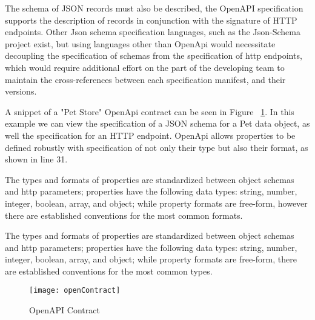 The schema of JSON records must also be described,
the OpenAPI specification supports the description of records
in conjunction with the signature of HTTP endpoints.
Other Json schema specification languages, such as the Json-Schema project
exist, but using languages other than OpenApi would necessitate decoupling the specification of schemas from the specification
of http endpoints, which would require additional effort on the part of the developing team to maintain the cross-references
between each specification manifest, and their versions.

A snippet of a "Pet Store" OpenApi contract can be seen in Figure ~\ref{fig:open_contract}.
In this example we can view the specification of a JSON schema for a Pet data object,
as well the specification for an HTTP endpoint.
OpenApi allows properties to be defined robustly with specification of not only their type but also their format, as shown in line 31.

The types and formats of properties are standardized between object schemas and http parameters;
properties have the following data types: string, number, integer, boolean, array, and object;
while property formats are free-form, however there are established conventions for the most common formats.

The types and formats of properties are standardized between object schemas and http parameters;
properties have the following data types: string, number, integer, boolean, array, and object;
while property formats are free-form, there are established conventions for the most common types.

\begin{figure}[htbp]
    \centering
    \texttt{[image: openContract]}
    \caption{OpenAPI Contract}
    \label{fig:open_contract}
\end{figure}

\newpage

